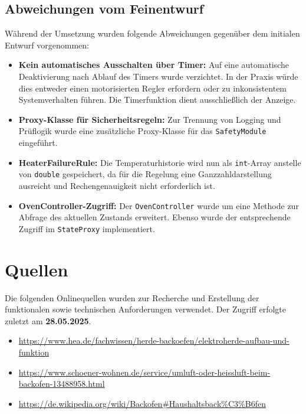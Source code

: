 \documentclass[a4paper,12pt]{article}
\begin{document}
\subsection{Abweichungen vom Feinentwurf}

Während der Umsetzung wurden folgende Abweichungen gegenüber dem initialen Entwurf vorgenommen:

\begin{itemize}
    \item \textbf{Kein automatisches Ausschalten über Timer:} Auf eine automatische Deaktivierung nach Ablauf des Timers wurde verzichtet. In der Praxis würde dies entweder einen motorisierten Regler erfordern oder zu inkonsistentem Systemverhalten führen. Die Timerfunktion dient ausschließlich der Anzeige.
    
    \item \textbf{Proxy-Klasse für Sicherheitsregeln:} Zur Trennung von Logging und Prüflogik wurde eine zusätzliche Proxy-Klasse für das \texttt{SafetyModule} eingeführt.
    
    \item \textbf{HeaterFailureRule:} Die Temperaturhistorie wird nun als \texttt{int}-Array anstelle von \texttt{double} gespeichert, da für die Regelung eine Ganzzahldarstellung ausreicht und Rechengenauigkeit nicht erforderlich ist.
    
    \item \textbf{OvenController-Zugriff:} Der \texttt{OvenController} wurde um eine Methode zur Abfrage des aktuellen Zustands erweitert. Ebenso wurde der entsprechende Zugriff im \texttt{StateProxy} implementiert.
\end{itemize}

\newpage

\section{Quellen}

Die folgenden Onlinequellen wurden zur Recherche und Erstellung der funktionalen sowie technischen Anforderungen verwendet. Der Zugriff erfolgte zuletzt am \textbf{28.05.2025}.

\begin{itemize}
    \item \url{https://www.hea.de/fachwissen/herde-backoefen/elektroherde-aufbau-und-funktion}
    \item \url{https://www.schoener-wohnen.de/service/umluft-oder-heissluft-beim-backofen-13488958.html}
    \item \url{https://de.wikipedia.org/wiki/Backofen#Haushaltsback%C3%B6fen}
\end{itemize}
\end{document}
